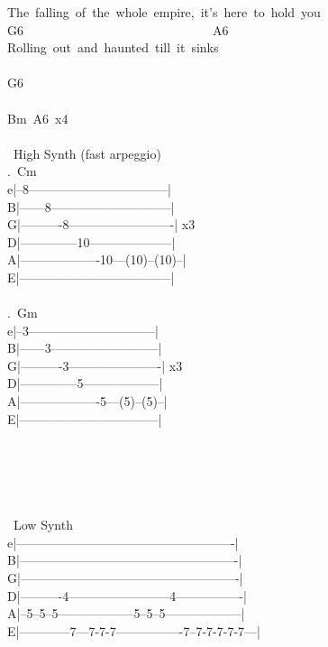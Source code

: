 {The\ falling\ of\ the\ whole\ empire,\ it's\ here\ to\ hold\ you\\
G6\ \ \ \ \ \ \ \ \ \ \ \ \ \ \ \ \ \ \ \ \ \ \ \ \ \ \ \ \ \ A6\\
Rolling\ out\ and\ haunted\ till\ it\ sinks\\
\\
G6\\
\\
Bm\ A6\ x4\\
\\
\lbrack\ High Synth (fast arpeggio)\rbrack\\
.\ Cm\\
e|--8---------------------------------|\\
B|------8-----------------------------|\\
G|----------8-------------------------| x3\\
D|--------------10--------------------|\\
A|-------------------10---(10)--(10)--|\\
E|------------------------------------|\\
\\
.\ Gm\\
e|--3------------------------------|\\
B|------3--------------------------|\\
G|----------3----------------------| x3\\
D|--------------5------------------|\\
A|-------------------5---(5)--(5)--|\\
E|---------------------------------|\\
\\
\\
\\
\\
\\
\lbrack\ Low Synth \rbrack\\
e|----------------------------------------------------|\\
B|----------------------------------------------------|\\
G|----------------------------------------------------|\\
D|----------4------------------------4----------------|\\
A|--5--5--5------------------5--5--5------------------|\\
E|------------7---7-7-7----------------7--7-7-7-7-7---|\\
\\
}
